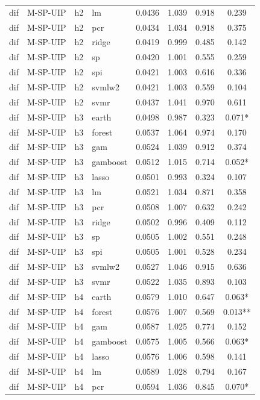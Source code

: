 \begin{ThreePartTable}
\begin{longtable}[t]{llclcccc}
dif & M-SP-UIP & h2 & lm & 0.0436 & 1.039 & 0.918 & 0.239\\
dif & M-SP-UIP & h2 & pcr & 0.0434 & 1.034 & 0.918 & 0.375\\
dif & M-SP-UIP & h2 & ridge & 0.0419 & 0.999 & 0.485 & 0.142\\
dif & M-SP-UIP & h2 & sp & 0.0420 & 1.001 & 0.555 & 0.259\\
dif & M-SP-UIP & h2 & spi & 0.0421 & 1.003 & 0.616 & 0.336\\
dif & M-SP-UIP & h2 & svmlw2 & 0.0421 & 1.003 & 0.559 & 0.104\\
dif & M-SP-UIP & h2 & svmr & 0.0437 & 1.041 & 0.970 & 0.611\\
\addlinespace
dif & M-SP-UIP & h3 & earth & 0.0498 & 0.987 & 0.323 & 0.071*\\
dif & M-SP-UIP & h3 & forest & 0.0537 & 1.064 & 0.974 & 0.170\\
dif & M-SP-UIP & h3 & gam & 0.0524 & 1.039 & 0.912 & 0.374\\
dif & M-SP-UIP & h3 & gamboost & 0.0512 & 1.015 & 0.714 & 0.052*\\
dif & M-SP-UIP & h3 & lasso & 0.0501 & 0.993 & 0.324 & 0.107\\
dif & M-SP-UIP & h3 & lm & 0.0521 & 1.034 & 0.871 & 0.358\\
dif & M-SP-UIP & h3 & pcr & 0.0508 & 1.007 & 0.632 & 0.242\\
dif & M-SP-UIP & h3 & ridge & 0.0502 & 0.996 & 0.409 & 0.112\\
dif & M-SP-UIP & h3 & sp & 0.0505 & 1.002 & 0.551 & 0.248\\
dif & M-SP-UIP & h3 & spi & 0.0505 & 1.001 & 0.528 & 0.234\\
dif & M-SP-UIP & h3 & svmlw2 & 0.0527 & 1.046 & 0.915 & 0.636\\
dif & M-SP-UIP & h3 & svmr & 0.0522 & 1.035 & 0.893 & 0.103\\
\addlinespace
dif & M-SP-UIP & h4 & earth & 0.0579 & 1.010 & 0.647 & 0.063*\\
dif & M-SP-UIP & h4 & forest & 0.0576 & 1.007 & 0.569 & 0.013**\\
dif & M-SP-UIP & h4 & gam & 0.0587 & 1.025 & 0.774 & 0.152\\
dif & M-SP-UIP & h4 & gamboost & 0.0575 & 1.005 & 0.566 & 0.063*\\
dif & M-SP-UIP & h4 & lasso & 0.0576 & 1.006 & 0.598 & 0.141\\
dif & M-SP-UIP & h4 & lm & 0.0589 & 1.028 & 0.794 & 0.167\\
dif & M-SP-UIP & h4 & pcr & 0.0594 & 1.036 & 0.845 & 0.070*\\

\end{longtable}
\end{ThreePartTable}
